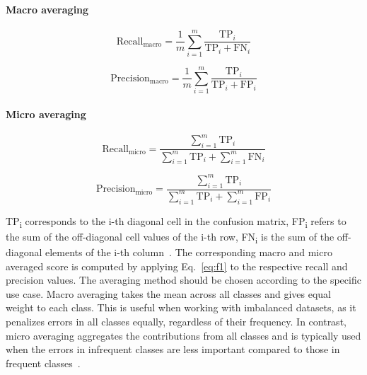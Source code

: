 \paragraph{Macro averaging}
\begin{equation}
    \text{Recall}_\text{macro} = \frac{1}{m} \sum_{i=1}^{m} 
    \frac{\text{TP}_i}{\text{TP}_i + \text{FN}_i}
\end{equation}

\begin{equation}
    \text{Precision}_\text{macro} = \frac{1}{m} \sum_{i=1}^{m} 
    \frac{\text{TP}_i}{\text{TP}_i + \text{FP}_i}
\end{equation}

\paragraph{Micro averaging}
\begin{equation} \label{eq:micro_prec}
    \text{Recall}_\text{micro} = \frac{\sum_{i=1}^{m} \text{TP}_i}
    {\sum_{i=1}^{m} \text{TP}_i + \sum_{i=1}^{m} \text{FN}_i}
\end{equation}

\begin{equation} \label{eq:micro_rec}
    \text{Precision}_\text{micro} = \frac{\sum_{i=1}^{m} \text{TP}_i}
    {\sum_{i=1}^{m} \text{TP}_i + \sum_{i=1}^{m} \text{FP}_i}       
\end{equation}

TP\textsubscript{i} corresponds to the i-th diagonal cell in the confusion
matrix, FP\textsubscript{i} refers to the sum of the off-diagonal cell values of
the i-th row, FN\textsubscript{i} is the sum of the off-diagonal elements of the
i-th column~\cite{takahashi2022confidence}. The corresponding macro and micro
averaged \ff{} score is computed by applying Eq.~\ref{eq:f1} to the respective
recall and precision values. The averaging method should be chosen according to
the specific use case. Macro averaging takes the mean across all classes and
gives equal weight to each class. This is useful when working with imbalanced
datasets, as it penalizes errors in all classes equally, regardless of their
frequency. In contrast, micro averaging aggregates the contributions from all
classes and is typically used when the errors in infrequent classes are less
important compared to those in frequent classes~\cite{sokolova2009systematic}.
 

